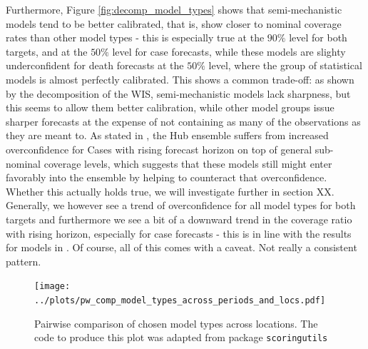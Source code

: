 Furthermore, Figure \ref{fig:decomp_model_types} shows that semi-mechanistic models tend to be better calibrated, that is, show closer to nominal coverage rates than other model types - this is especially true at the $90\%$ level for both targets, and at the $50\%$ level for case forecasts, while these models are slighty underconfident for death forecasts at the $50\%$ level, where the group of statistical models is almost perfectly calibrated. This shows a common trade-off: as shown by the decomposition of the WIS, semi-mechanistic models lack sharpness, but this seems to allow them better calibration, while other model groups issue sharper forecasts at the expense of not containing as many of the observations as they are meant to. As stated in \cite{sherratt_european_2022}, the Hub ensemble suffers from increased overconfidence for Cases with rising forecast horizon on top of general sub-nominal coverage levels, which suggests that these models still might enter favorably into the ensemble by helping to counteract that overconfidence. Whether this actually holds true, we will investigate further in section XX. Generally, we however see a trend of overconfidence for all model types for both targets and furthermore we see a bit of a downward trend in the coverage ratio with rising horizon, especially for case forecasts - this is in line with the results for models in \cite{sherratt_european_2022}.
Of course, all of this comes with a caveat. Not really a consistent pattern.
\begin{figure}
\centering
\texttt{[image: ../plots/pw\_comp\_model\_types\_across\_periods\_and\_locs.pdf]}
\caption{Pairwise comparison of chosen model types across locations. The code to produce this plot was adapted from package \texttt{scoringutils}}
\label{fig:pw_comp_modeltypes_byloc}
\end{figure}
